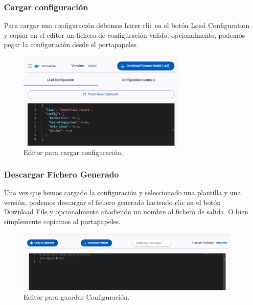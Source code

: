 \documentclass[12pt, a4paper, twoside]{article}
\begin{document}
\begin{umaappendices}
	\subsubsection{Cargar configuración}
	Para cargar una configuración debemos hacer clic en el botón Load Configuration y copiar en el editor un fichero de configuración valido,
	opcionalmente, podemos pegar la configuración desde el portapapeles.
	\begin{figure}[h]
		\centering
			\includegraphics[width=0.75\textwidth]{loadconfiguration.png}
		\caption{Editor para cargar configuración,}
	\end{figure}
	\newpage

	\subsubsection{Descargar Fichero Generado}
	Una vez que hemos cargado la configuración y seleccionado una plantilla y una versión, podemos descargar el fichero generado haciendo clic en el botón Download File y opcionalmente añadiendo un nombre al fichero de salida. O bien simplemente copiamos al portapapeles.
	\begin{figure}[h]
		\centering
			\includegraphics[width=1\textwidth]{donwloadToolbar.png}
		\caption{Editor para guardar Configuración.}
	\end{figure}


	\newpage

\end{umaappendices}
\end{document}
